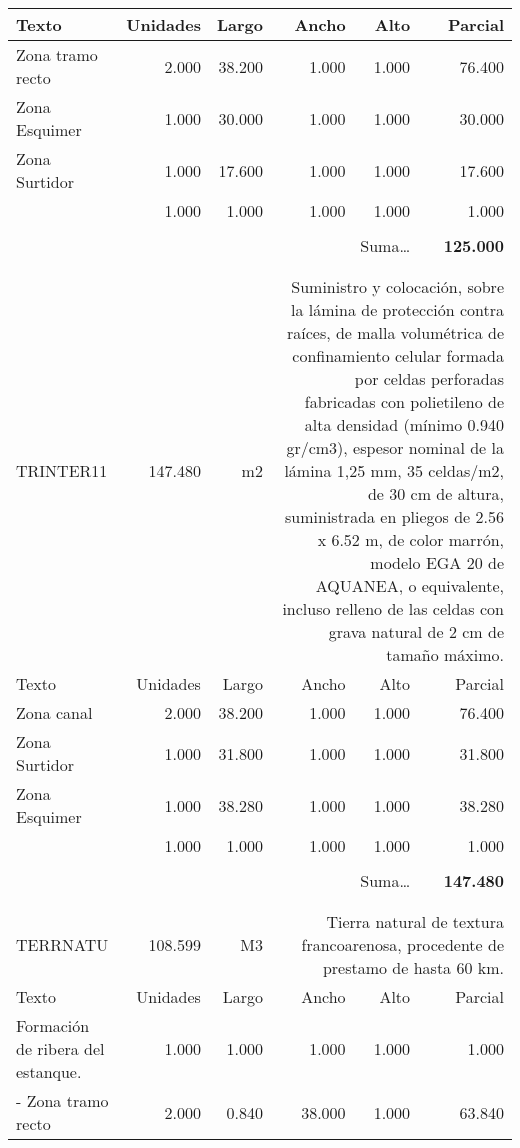 \documentclass{book}%
\begin{document}
\begin{longtable}{lrrrrr}
Texto&Unidades&Largo&Ancho&Alto&Parcial\\%
\hline%
\multicolumn{1}{p{3.5cm}}{Zona tramo recto}&2.000&38.200&1.000&1.000&76.400\\%
\multicolumn{1}{p{3.5cm}}{Zona Esquimer}&1.000&30.000&1.000&1.000&30.000\\%
\multicolumn{1}{p{3.5cm}}{Zona Surtidor}&1.000&17.600&1.000&1.000&17.600\\%
\multicolumn{1}{p{3.5cm}}{}&1.000&1.000&1.000&1.000&1.000\\%
&&&&&\\%
\multicolumn{5}{r}{Suma\ldots}&\textbf{125.000}\\%
\hline%
&&&&&\\%
&&&&&\\%
TRINTER11&147.480& m2&\multicolumn{3}{p{6cm}}{\scriptsize Suministro y colocación, sobre la lámina de protección contra raíces, de malla volumétrica de confinamiento celular formada por celdas perforadas fabricadas con polietileno de alta densidad (mínimo 0.940 gr/cm3), espesor nominal de la lámina 1,25 mm, 35 celdas/m2, de 30 cm de altura, suministrada en pliegos de 2.56 x 6.52 m, de color marrón, modelo EGA 20 de AQUANEA, o equivalente, incluso relleno de las celdas con grava natural de 2 cm de tamaño máximo.\normalsize}\\%
Texto&Unidades&Largo&Ancho&Alto&Parcial\\%
\hline%
\multicolumn{1}{p{3.5cm}}{Zona canal}&2.000&38.200&1.000&1.000&76.400\\%
\multicolumn{1}{p{3.5cm}}{Zona Surtidor}&1.000&31.800&1.000&1.000&31.800\\%
\multicolumn{1}{p{3.5cm}}{Zona Esquimer}&1.000&38.280&1.000&1.000&38.280\\%
\multicolumn{1}{p{3.5cm}}{}&1.000&1.000&1.000&1.000&1.000\\%
&&&&&\\%
\multicolumn{5}{r}{Suma\ldots}&\textbf{147.480}\\%
\hline%
&&&&&\\%
&&&&&\\%
TERRNATU&108.599& M3&\multicolumn{3}{p{6cm}}{\scriptsize Tierra natural de textura francoarenosa, procedente de prestamo de hasta 60 km.\normalsize}\\%
Texto&Unidades&Largo&Ancho&Alto&Parcial\\%
\hline%
\multicolumn{1}{p{3.5cm}}{Formación de ribera del estanque.}&1.000&1.000&1.000&1.000&1.000\\%
\multicolumn{1}{p{3.5cm}}{{-} Zona tramo recto}&2.000&0.840&38.000&1.000&63.840\\%

\end{longtable}
\end{document}

